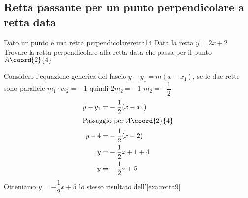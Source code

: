 \subsection{Retta passante per un punto perpendicolare a retta data}
\begin{esempiot}{Dato un punto e una retta perpendicolare}{retta14}
	Data la retta $y=2x+2$ Trovare la retta perpendicolare alla retta data che  passa per il punto	$A\coord{2}{4}$
\end{esempiot}
Considero l'equazione generica del fascio $y-y_1=m(x-x_1)$, se le due rette sono parallele $m_1\cdot m_2=-1$ quindi $2m_2=-1$ $m_2=-\dfrac{1}{2}$
\begin{align*}
	y-y_1=&-\dfrac{1}{2}(x-x_1)\\
	\intertext{Passaggio per $A\coord{2}{4}$}
	y-4=&-\dfrac{1}{2}(x-2)\\
	y=&-\dfrac{1}{2}x+1+4\\
	y=&-\dfrac{1}{2}x+5\\
\end{align*}
Otteniamo 	$y=-\dfrac{1}{2}x+5$ lo stesso risultato dell'\cref{exa:retta9}

